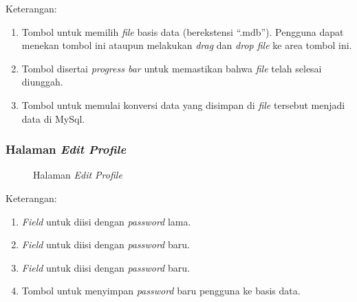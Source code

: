 Keterangan:
\begin{enumerate}
	\item Tombol untuk memilih \textit{file} basis data (berekstensi ``.mdb''). Pengguna dapat menekan tombol ini ataupun melakukan \textit{drag} dan \textit{drop file} ke area tombol ini.
	\item Tombol disertai \textit{progress bar} untuk memastikan bahwa \textit{file} telah selesai diunggah. 
	\item Tombol untuk memulai konversi data yang disimpan di \textit{file} tersebut menjadi data di MySql.
\end{enumerate}


\subsubsection{Halaman \textit{Edit Profile}}
\label{sec:page7}

\begin{figure}[H]
	\centering
	\caption{Halaman \textit{Edit Profile}}
	\label{fig:page7}
\end{figure}	

Keterangan:
\begin{enumerate}
	\item \textit{Field} untuk diisi dengan \textit{password} lama.
	\item \textit{Field} untuk diisi dengan \textit{password} baru.
	\item \textit{Field} untuk diisi dengan \textit{password} baru.	
	\item Tombol untuk menyimpan \textit{password} baru pengguna ke basis data.
\end{enumerate}
